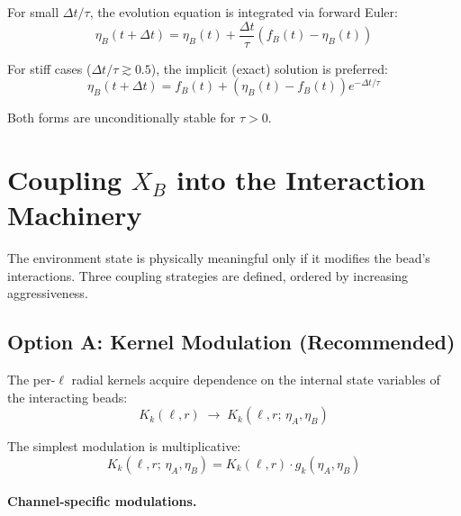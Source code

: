\documentclass[11pt]{article}
\begin{document}
For small $\Delta t / \tau$, the evolution equation is integrated via
forward Euler:
\begin{equation}
    \eta_B(t + \Delta t) = \eta_B(t) + \frac{\Delta t}{\tau}
    \left( f_B(t) - \eta_B(t) \right)
\end{equation}

For stiff cases ($\Delta t / \tau \gtrsim 0.5$), the implicit (exact)
solution is preferred:
\begin{equation}
    \eta_B(t + \Delta t) = f_B(t)
    + \left(\eta_B(t) - f_B(t)\right) e^{-\Delta t / \tau}
\end{equation}

Both forms are unconditionally stable for $\tau > 0$.

\section{Coupling $X_B$ into the Interaction Machinery}

The environment state is physically meaningful only if it modifies the
bead's interactions.  Three coupling strategies are defined, ordered by
increasing aggressiveness.

\subsection{Option A: Kernel Modulation (Recommended)}

The per-$\ell$ radial kernels acquire dependence on the internal state
variables of the interacting beads:
\begin{equation}
    K_k(\ell, r) \;\longrightarrow\;
    K_k(\ell, r;\, \eta_A, \eta_B)
\end{equation}

The simplest modulation is multiplicative:
\begin{equation}
    K_k(\ell, r;\, \eta_A, \eta_B)
    = K_k(\ell, r) \cdot g_k(\eta_A, \eta_B)
\end{equation}

\paragraph{Channel-specific modulations.}
\end{document}

